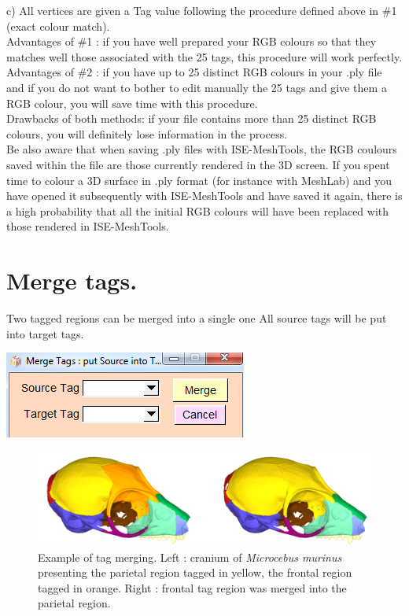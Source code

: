 c) All vertices are given a Tag value following the procedure defined above in \#1 (exact colour match).\\
Advantages of \#1 : if you have well prepared your RGB colours so that they matches well those associated with the 25 tags, this procedure will work perfectly.\\
Advantages of \#2 : if you have up to 25 distinct RGB colours in your .ply file and if you do not want to bother to edit manually the 25 tags and give them a RGB colour, you will save time with this procedure. 
\\Drawbacks of both methods: if your file contains more than 25 distinct RGB colours, you will definitely lose information in the process.
\\Be also aware that when saving .ply files with ISE-MeshTools, the RGB coulours saved within the file are those currently rendered in the 3D screen. If you spent time to colour a 3D surface in .ply format (for instance with MeshLab) and you have opened it subsequently with ISE-MeshTools and have saved it again, there is a high probability that all the initial RGB colours will have been replaced with those rendered in ISE-MeshTools.


\section{Merge tags.}
\noindent
\begin{minipage}{0.5\textwidth}
Two tagged regions can be merged into a single one
All source tags will be put into target tags.
\end{minipage}    
\begin{minipage}{0.5\textwidth}\centering
  \includegraphics[scale=0.5]{images/Tags/Merge_tags.png}
 \end{minipage} 
\noindent
\begin{figure}
  \centering
  \includegraphics[scale=0.25]{images/Tags/Merge.png} 
	\caption{Example of tag merging. Left : cranium of \textit{Microcebus murinus} presenting the parietal region
tagged in yellow, the frontal region tagged in orange. Right : frontal tag region was merged into
the parietal region.}
\label{merge_tags}
 
\end{figure}



